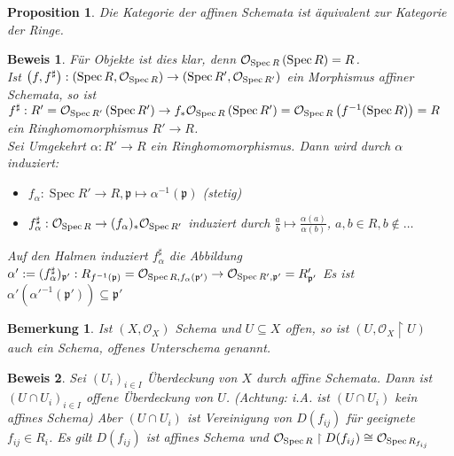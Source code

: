 \documentclass[a4paper,oneside]{scrbook}
\theoremstyle{break}
\newtheorem{Bem}[Def]{Bemerkung}
\newtheorem{Prop}[Def]{Proposition}
\theoremstyle{nonumberbreak}
\theoremstyle{nonumberplain}
\newtheorem{Bew}{Beweis}
\theoremstyle{break}
\newcommand{\Spec}{%
	\ensuremath{\operatorname{Spec}}%
}
\begin{document}
\begin{Prop}
 Die Kategorie der affinen Schemata ist äquivalent zur Kategorie der Ringe.
\end{Prop}
\begin{Bew}
	Für Objekte ist dies klar, denn $\mathcal{O}_{\Spec R}\left(\Spec R\right) = R$. \\
	Ist $\left( f, f^\sharp \right): \left( \Spec R,\mathcal{O}_{\Spec R} \right)  \rightarrow \left( \Spec R',\mathcal{O}_{\Spec R'} \right)$ ein Morphismus affiner Schemata, so ist $f^\sharp: R' =\mathcal{O}_{\Spec R'}\left(\Spec R'\right) \rightarrow  f_* \mathcal{O}_{\Spec R}\left(\Spec R'\right)=\mathcal{O}_{\Spec R}\left(f^{-1} (\Spec R)\right) = R$ ein Ringhomomorphismus $R' \rightarrow R$. \\
	Sei Umgekehrt $\alpha : R' \rightarrow R$ ein Ringhomomorphismus. Dann wird durch $\alpha$ induziert: 
	\begin{itemize}
		\item $f_\alpha : \Spec R' \rightarrow R, \mathfrak{p} \mapsto \alpha^{-1}(\mathfrak{p})$  (stetig)
		\item $f_\alpha^\sharp: \mathcal{O}_{\Spec R} \rightarrow (f_\alpha)_* \mathcal{O}_{\Spec R'}$ induziert durch $\frac{a}{b} \mapsto \frac{\alpha(a)}{\alpha(b)}$, $a,b \in R, b \notin \dots$ 
	\end{itemize}
	Auf den Halmen induziert $f_\alpha^\sharp$ die Abbildung $\alpha':= (f_\alpha^\sharp)_{\mathfrak{p}'}: R_{f^{-1}(\mathfrak{p})} = \mathcal{O}_{\Spec R, f_\alpha(\mathfrak{p}')} \rightarrow  \mathcal{O}_{\Spec R', \mathfrak{p}'}= R'_{\mathfrak{p}'}$
	Es ist $\alpha' (\alpha'^{-1} (\mathfrak{p}') ) \subseteq \mathfrak{p}'$
\end{Bew}

\begin{Bem}
	Ist $\left( X, \mathcal{O}_X \right)$ Schema und $U \subseteq X$ offen, so ist $\left( U, \mathcal{O}_X \restriction U \right)$ auch ein Schema, offenes Unterschema genannt.
\end{Bem}
\begin{Bew}
 Sei $(U_i)_{i \in I}$ Überdeckung von $X$ durch affine Schemata. Dann ist $(U \cap U_i)_{i \in I}$ offene Überdeckung von $U$. (Achtung: i.A. ist $(U \cap U_i)$ kein affines Schema) Aber $(U \cap U_i)$ ist Vereinigung von $D(f_{ij})$ für geeignete $f_{ij} \in R_i$. Es gilt $D(f_{ij})$ ist affines Schema und $\mathcal{O}_{\Spec R} \restriction D(f_{ij}) \cong \mathcal{O}_{\Spec R_{f_{ij}}}$
\end{Bew}
\end{document}
